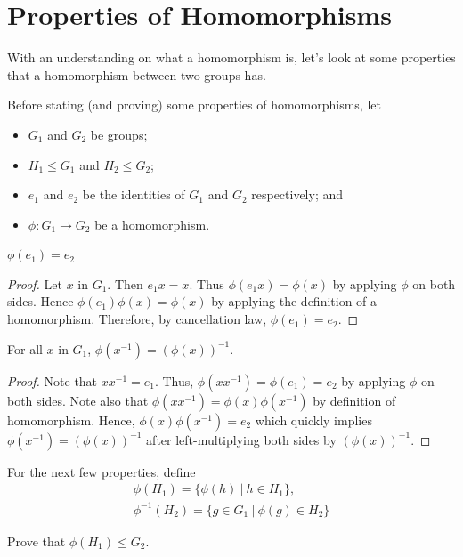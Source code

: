 \section{Properties of Homomorphisms}
With an understanding on what a homomorphism is, let's look at some properties that a homomorphism between two groups has.

Before stating (and proving) some properties of homomorphisms, let
\begin{itemize}
    \item $G_1$ and $G_2$ be groups;
    \item $H_1 \leq G_1$ and $H_2 \leq G_2$;
    \item $e_1$ and $e_2$ be the identities of $G_1$ and $G_2$ respectively; and
    \item $\phi: G_1 \to G_2$ be a homomorphism.
\end{itemize}

\begin{proposition}
    $\phi(e_1) = e_2$
\end{proposition}
\begin{proof}
    Let $x$ in $G_1$. Then $e_1x = x$. Thus $\phi(e_1x) = \phi(x)$ by applying $\phi$ on both sides. Hence $\phi(e_1)\phi(x) = \phi(x)$ by applying the definition of a homomorphism. Therefore, by cancellation law, $\phi(e_1) = e_2$.
\end{proof}

\newpage

\begin{proposition}
    For all $x$ in $G_1$, $\phi(x^{-1}) = \left(\phi(x)\right)^{-1}$.
\end{proposition}
\begin{proof}
    Note that $xx^{-1} = e_1$. Thus, $\phi(xx^{-1}) = \phi(e_1) = e_2$ by applying $\phi$ on both sides. Note also that $\phi(xx^{-1}) = \phi(x)\phi(x^{-1})$ by definition of homomorphism. Hence, $\phi(x)\phi(x^{-1}) = e_2$ which quickly implies $\phi(x^{-1}) = \left(\phi(x)\right)^{-1}$ after left-multiplying both sides by $\left(\phi(x)\right)^{-1}$.
\end{proof}

For the next few properties, define
\begin{gather*}
    \phi(H_1) = \{\phi(h) \ | \ h \in H_1\},\\
    \phi^{-1}(H_2) = \{g \in G_1 \ | \ \phi(g) \in H_2\}
\end{gather*}

\begin{exercise}
    Prove that $\phi(H_1) \leq G_2$.
\end{exercise}

